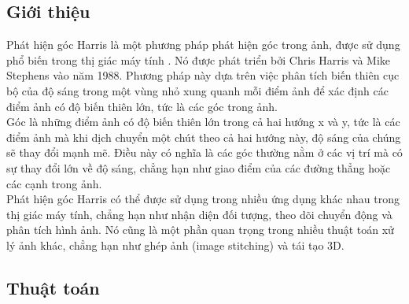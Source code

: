 \documentclass[12pt]{article}
\begin{document}
\subsection{Giới thiệu}

Phát hiện góc Harris là một phương pháp phát hiện góc trong ảnh, được sử dụng phổ biến trong thị giác máy tính \cite{harris_wiki}. Nó được phát triển bởi Chris Harris và Mike Stephens vào năm 1988. Phương pháp này dựa trên việc phân tích biến thiên cục bộ của độ sáng trong một vùng nhỏ xung quanh mỗi điểm ảnh để xác định các điểm ảnh có độ biến thiên lớn, tức là các góc trong ảnh.\\
Góc là những điểm ảnh có độ biến thiên lớn trong cả hai hướng x và y, tức là các điểm ảnh mà khi dịch chuyển một chút theo cả hai hướng này, độ sáng của chúng sẽ thay đổi mạnh mẽ. Điều này có nghĩa là các góc thường nằm ở các vị trí mà có sự thay đổi lớn về độ sáng, chẳng hạn như giao điểm của các đường thẳng hoặc các cạnh trong ảnh.\\
Phát hiện góc Harris có thể được sử dụng trong nhiều ứng dụng khác nhau trong thị giác máy tính, chẳng hạn như nhận diện đối tượng, theo dõi chuyển động và phân tích hình ảnh. Nó cũng là một phần quan trọng trong nhiều thuật toán xử lý ảnh khác, chẳng hạn như ghép ảnh (image stitching) và tái tạo 3D.

\subsection{Thuật toán}
\end{document}
